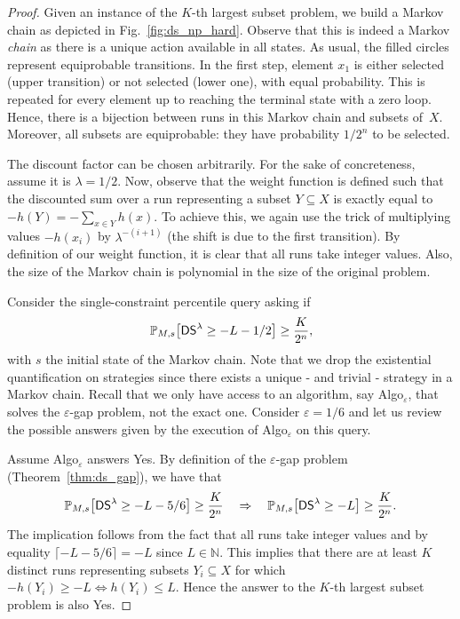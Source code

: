 \documentclass{llncs}
\newcommand*{\pr}{\mathbb{P}}
\newcommand{\discSum}[1]{\ensuremath{{\sf DS}^{#1}} }
\newcommand{\discount}{\ensuremath{\lambda} }
\newcommand{\nat}{\ensuremath{\mathbb{N}} }
\begin{document}
\begin{proof}
Given an instance of the $K$-th largest subset problem, we build a Markov chain as depicted in Fig.~\ref{fig:ds_np_hard}. Observe that this is indeed a Markov \textit{chain} as there is a unique action available in all states. As usual, the filled circles represent equiprobable transitions. In the first step, element $x_{1}$ is either selected (upper transition) or not selected (lower one), with equal probability. This is repeated for every element up to reaching the terminal state with a zero loop. Hence, there is a bijection between runs in this Markov chain and subsets of~$X$. Moreover, all subsets are equiprobable: they have probability $1/2^{n}$ to be selected.

The discount factor can be chosen arbitrarily. For the sake of concreteness, assume it is $\discount = 1/2$. Now, observe that the weight function is defined such that the discounted sum over a run representing a subset $Y \subseteq X$ is exactly equal to $-h(Y) = -\sum_{x \in Y} h(x)$. To achieve this, we again use the trick of multiplying values $-h(x_{i})$ by $\discount^{-(i+1)}$ (the shift is due to the first transition). By definition of our weight function, it is clear that all runs take integer values. Also, the size of the Markov chain is polynomial in the size of the original problem.

Consider the single-constraint percentile query asking if
\begin{equation*}
\pr_{M,s} \big[\discSum{\discount} \geq -L - 1/2\big] \geq \dfrac{K}{2^{n}},
\end{equation*}
with $s$ the initial state of the Markov chain. Note that we drop the existential quantification on strategies since there exists a unique - and trivial - strategy in a Markov chain. Recall that we only have access to an algorithm, say \textsf{Algo}$_{\varepsilon}$, that solves the $\varepsilon$-gap problem, not the exact one. Consider $\varepsilon = 1/6$ and let us review the possible answers given by the execution of \textsf{Algo}$_{\varepsilon}$ on this query.

Assume \textsf{Algo}$_{\varepsilon}$ answers \textsf{Yes}. By definition of the $\varepsilon$-gap problem (Theorem~\ref{thm:ds_gap}), we have that
\begin{equation*}
\pr_{M,s} \big[\discSum{\discount} \geq -L-5/6\big] \geq \dfrac{K}{2^{n}} \quad\Rightarrow\quad \pr_{M,s} \big[\discSum{\discount} \geq -L\big] \geq \dfrac{K}{2^{n}}.
\end{equation*}
The implication follows from the fact that all runs take integer values and by equality $\lceil -L - 5/6\rceil = -L$ since $L \in \nat$. This implies that there are at least $K$ distinct runs representing subsets $Y_{i} \subseteq X$ for which $-h(Y_{i}) \geq -L \Leftrightarrow h(Y_{i}) \leq L$. Hence the answer to the $K$-th largest subset problem is also \textsf{Yes}.


\end{proof}
\end{document}
